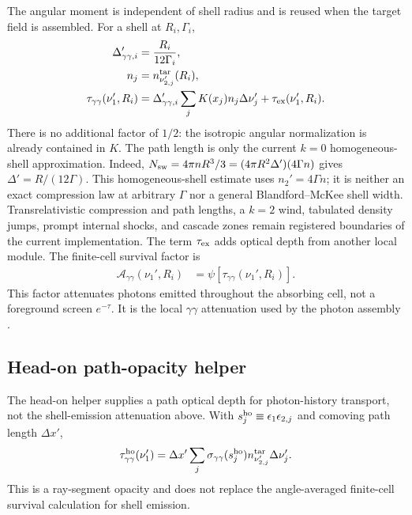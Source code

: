 \documentclass[twocolumn]{aastex702}
\begin{document}
The angular moment is independent of shell radius and is reused when the target
field is assembled.  For a shell at \(R_i,\Gamma_i\),
\begin{equation}
\begin{aligned}
\Delta'_{\gamma\gamma,i}&=\frac{R_i}{12\Gamma_i},\\
n_j&=n_{\nu_{2,j}'}^{\rm tar}(R_i),\\
\tau_{\gamma\gamma}(\nu_1',R_i)
&=\Delta'_{\gamma\gamma,i}
\sum_j K(x_j)n_j\Delta\nu_j'
+\tau_{\rm ex}(\nu_1',R_i).
\end{aligned}
\end{equation}
There is no additional factor of \(1/2\): the isotropic angular normalization is
already contained in \(K\).  The path length is only the current \(k=0\)
homogeneous-shell approximation.  Indeed,
\(N_{\rm sw}=4\pi nR^3/3=(4\pi R^2\Delta')(4\Gamma n)\) gives
\(\Delta'=R/(12\Gamma)\).  This homogeneous-shell estimate uses
\(n_2'=4\Gamma n\); it is neither an exact compression law at arbitrary
\(\Gamma\) nor a general Blandford--McKee shell width.  Transrelativistic
compression and path lengths, a \(k=2\) wind, tabulated density jumps, prompt
internal shocks, and cascade zones remain registered boundaries of the current
implementation.  The term \(\tau_{\rm ex}\)
adds optical depth from another local module.  The finite-cell survival factor is
\begin{equation}
\begin{aligned}
\mathcal{A}_{\gamma\gamma}(\nu_1',R_i)
&=\psi[\tau_{\gamma\gamma}(\nu_1',R_i)] .
\end{aligned}
\end{equation}
This factor attenuates photons emitted throughout the absorbing cell, not a
foreground screen \(e^{-\tau}\).  It is the local \(\gamma\gamma\) attenuation
used by the photon assembly \citep{GouldSchreder1967,Svensson1987}.

\subsection{Head-on path-opacity helper}

The head-on helper supplies a path optical depth for photon-history transport,
not the shell-emission attenuation above.  With
\(s_j^{\rm ho}\equiv\epsilon_1\epsilon_{2,j}\) and comoving path length
\(\Delta x'\),
\begin{equation}
\begin{aligned}
\tau_{\gamma\gamma}^{\rm ho}(\nu_1')=
\Delta x'
\sum_j \sigma_{\gamma\gamma}(s_j^{\rm ho})
n_{\nu_{2,j}'}^{\rm tar}\Delta\nu_j' .
\end{aligned}
\end{equation}
This is a ray-segment opacity and does not replace the angle-averaged finite-cell
survival calculation for shell emission.
\end{document}

